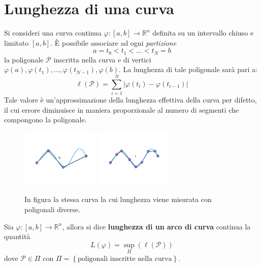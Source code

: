 \section{Lunghezza di una curva}
Si consideri una curva continua $\varphi:[a,b] \to \mathbb{R}^n$ definita su un intervallo chiuso e limitato $[a,b]$. È possibile associare ad ogni \textit{partizione} 
\begin{equation}
    a=t_0<t_1<...<t_N=b
\end{equation}
la poligonale $\mathcal{P}$ inscritta nella curva e di vertici $\varphi(a),\varphi(t_1),\dots,\varphi(t_{N-1}), \varphi(b)$. La lunghezza di tale poligonale sarà pari a:
\begin{equation}
    \ell(\mathcal{P})=\sum\limits_{i=1}^{N}{|\varphi(t_i)-\varphi(t_{i-1})|}
\end{equation}
Tale valore è un'approssimazione della lunghezza effettiva della curva per difetto, il cui errore diminuisce in maniera proporzionale al numero di segmenti che compongono la poligonale.
\begin{figure}[H]
    \centering
    \includegraphics[width=0.33\textwidth]{Capitoli/Capitolo1/lunghezza1.png}
    \hspace{0.05\textwidth} %
    \includegraphics[width=0.33\textwidth]{Capitoli/Capitolo1/lunghezza2.png}
    \caption{In figura la stessa curva la cui lunghezza viene misurata con poligonali diverse.}
\end{figure}
\begin{definition}
    Sia $\varphi:[a,b]\to \mathbb{R}^n$, allora si dice \textbf{lunghezza di un arco di curva} continua la quantità
    \begin{equation}
        L(\varphi)=\sup\limits_{\Pi}(\ell(\mathcal{P}))
    \end{equation}
    dove $\mathcal{P} \in \Pi$ con $\Pi=\left\{\text{poligonali inscritte nella curva}\right\}$.
\end{definition}

